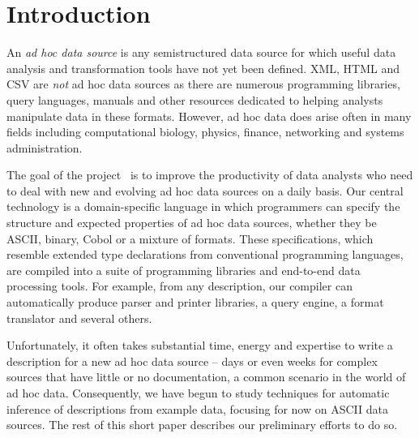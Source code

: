 \documentclass{article}
\begin{document}
\section*{Introduction}
\label{intro}

An {\em ad hoc data source} is any semistructured data source
for which useful data analysis and transformation tools
have not yet been defined. XML, HTML and CSV are {\em not} 
ad hoc data sources as there are numerous programming libraries,
query languages, manuals and other resources dedicated to
helping analysts manipulate data in these formats.
However, ad hoc data does arise often in many fields including
computational biology, physics, finance, networking and 
systems administration.

The goal of the \pads{} project~\cite{padsweb} is to improve the
productivity of data analysts who need to deal with new and evolving
ad hoc data sources on a daily basis.  Our central technology is a
domain-specific language in which programmers can specify the
structure and expected properties of ad hoc data sources, whether they
be ASCII, binary, Cobol or a mixture of formats.  These
specifications, which resemble extended type declarations from
conventional programming languages, are compiled into a suite of
programming libraries and end-to-end data processing tools.  For
example, from any \pads{} description, our compiler can automatically
produce parser and printer libraries, a query engine, a format translator
and several others.

Unfortunately, it often takes substantial time, energy and expertise
to write a \pads{} description for a new ad hoc data source
-- days or even weeks for complex sources that have little or
no documentation, a common scenario in the world of ad hoc data.
Consequently, we have begun to study techniques for automatic
inference of \pads{} descriptions from example data, focusing for now
on ASCII data sources.   The rest of this 
short paper describes our preliminary efforts to do so.


\end{document}
